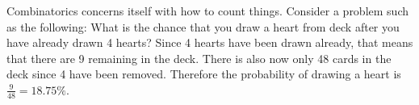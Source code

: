 \documentclass[../notes.tex]{subfiles}
\begin{document}

Combinatorics concerns itself with how to count things. Consider a problem such as the following: What is the chance that you draw a heart from deck after you have already drawn 4 hearts? Since 4 hearts have been drawn already, that means that there are 9 remaining in the deck. There is also now only 48 cards in the deck since 4 have been removed. Therefore the probability of drawing a heart is $\frac{9}{48} = 18.75\%$.
\end{document}

